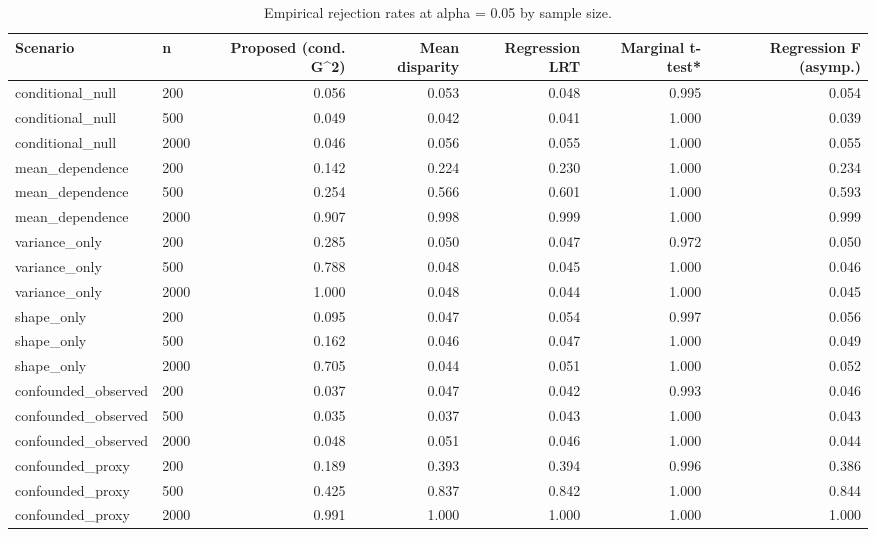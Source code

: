 \begin{table}[t]
\centering
\small
\begin{tabular}{llrrrrr}
\toprule
Scenario & n & Proposed (cond. G\^{}2) & Mean disparity & Regression LRT & Marginal t-test* & Regression F (asymp.) \\
\midrule
conditional\_null & 200 & 0.056 & 0.053 & 0.048 & 0.995 & 0.054 \\
conditional\_null & 500 & 0.049 & 0.042 & 0.041 & 1.000 & 0.039 \\
conditional\_null & 2000 & 0.046 & 0.056 & 0.055 & 1.000 & 0.055 \\
mean\_dependence & 200 & 0.142 & 0.224 & 0.230 & 1.000 & 0.234 \\
mean\_dependence & 500 & 0.254 & 0.566 & 0.601 & 1.000 & 0.593 \\
mean\_dependence & 2000 & 0.907 & 0.998 & 0.999 & 1.000 & 0.999 \\
variance\_only & 200 & 0.285 & 0.050 & 0.047 & 0.972 & 0.050 \\
variance\_only & 500 & 0.788 & 0.048 & 0.045 & 1.000 & 0.046 \\
variance\_only & 2000 & 1.000 & 0.048 & 0.044 & 1.000 & 0.045 \\
shape\_only & 200 & 0.095 & 0.047 & 0.054 & 0.997 & 0.056 \\
shape\_only & 500 & 0.162 & 0.046 & 0.047 & 1.000 & 0.049 \\
shape\_only & 2000 & 0.705 & 0.044 & 0.051 & 1.000 & 0.052 \\
confounded\_observed & 200 & 0.037 & 0.047 & 0.042 & 0.993 & 0.046 \\
confounded\_observed & 500 & 0.035 & 0.037 & 0.043 & 1.000 & 0.043 \\
confounded\_observed & 2000 & 0.048 & 0.051 & 0.046 & 1.000 & 0.044 \\
confounded\_proxy & 200 & 0.189 & 0.393 & 0.394 & 0.996 & 0.386 \\
confounded\_proxy & 500 & 0.425 & 0.837 & 0.842 & 1.000 & 0.844 \\
confounded\_proxy & 2000 & 0.991 & 1.000 & 1.000 & 1.000 & 1.000 \\
\bottomrule
\end{tabular}
\caption{Empirical rejection rates at alpha = 0.05 by sample size.}
\end{table}